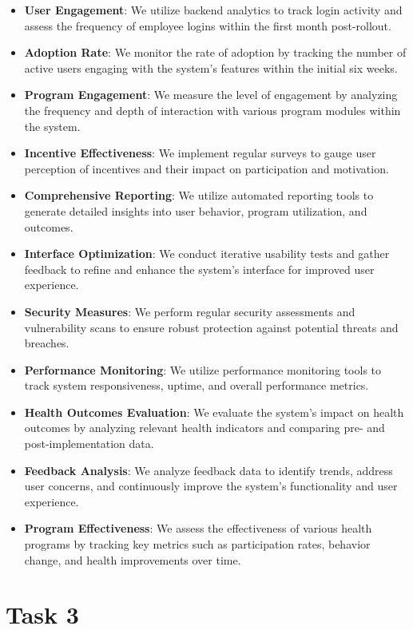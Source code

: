 \begin{itemize}
    \item \textbf{User Engagement}: We utilize backend analytics to track login activity and assess the frequency of employee logins within the first month post-rollout.
    \item \textbf{Adoption Rate}: We monitor the rate of adoption by tracking the number of active users engaging with the system's features within the initial six weeks.
    \item \textbf{Program Engagement}: We measure the level of engagement by analyzing the frequency and depth of interaction with various program modules within the system.
    \item \textbf{Incentive Effectiveness}: We implement regular surveys to gauge user perception of incentives and their impact on participation and motivation.
    \item \textbf{Comprehensive Reporting}: We utilize automated reporting tools to generate detailed insights into user behavior, program utilization, and outcomes.
    \item \textbf{Interface Optimization}: We conduct iterative usability tests and gather feedback to refine and enhance the system's interface for improved user experience.
    \item \textbf{Security Measures}: We perform regular security assessments and vulnerability scans to ensure robust protection against potential threats and breaches.
    \item \textbf{Performance Monitoring}: We utilize performance monitoring tools to track system responsiveness, uptime, and overall performance metrics.
    \item \textbf{Health Outcomes Evaluation}: We evaluate the system's impact on health outcomes by analyzing relevant health indicators and comparing pre- and post-implementation data.
    \item \textbf{Feedback Analysis}: We analyze feedback data to identify trends, address user concerns, and continuously improve the system's functionality and user experience.
    \item \textbf{Program Effectiveness}: We assess the effectiveness of various health programs by tracking key metrics such as participation rates, behavior change, and health improvements over time.
\end{itemize}

\section{Task 3}

